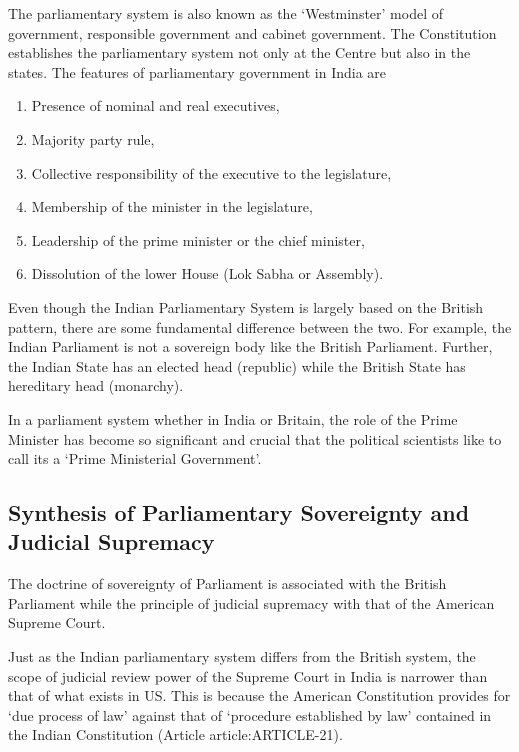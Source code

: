 \begin{multicol}{2}
The parliamentary system is also known as the `Westminster' model of government, responsible government and cabinet government. The Constitution establishes the parliamentary system not only at the Centre but also in the states. The features of parliamentary government in India are

\renewcommand{\labelenumi}{\textbf{(\alph{enumi})}}
\begin{enumerate}
  \item Presence of nominal and real executives,
  \item Majority party rule,
  \item Collective responsibility of the executive to the legislature,
  \item Membership of the minister in the legislature,
  \item Leadership of the prime minister or the chief minister,
  \item Dissolution of the lower House (Lok Sabha or Assembly).
\end{enumerate}

Even though the Indian Parliamentary System is largely based on the British pattern, there are some fundamental difference between the two. For example, the Indian Parliament is not a sovereign body like the British Parliament. Further, the Indian State has an elected head (republic) while the British State has hereditary head (monarchy).

In a parliament system whether in India or Britain, the role of the Prime Minister has become so significant and crucial that the political scientists like to call its a `Prime Ministerial Government'.

\subsection{Synthesis of Parliamentary Sovereignty and Judicial Supremacy}

The doctrine of sovereignty of Parliament is associated with the British Parliament while the principle of judicial supremacy with that of the American Supreme Court.

Just as the Indian parliamentary system differs from the British system, the scope of judicial review power of the Supreme Court in India is narrower than that of what exists in US. This is because the American Constitution provides for `due process of law' against that of `procedure established by law' contained in the Indian Constitution (Article \gls{article:ARTICLE-21}).


\end{multicol}
